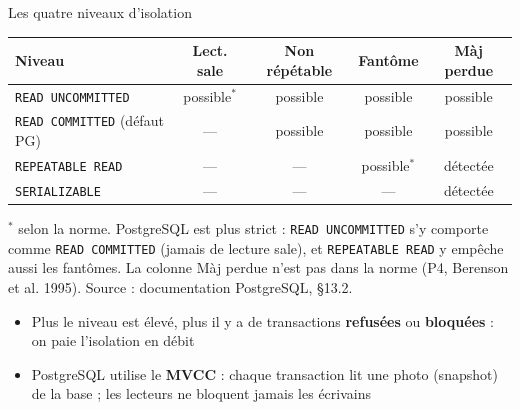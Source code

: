 \documentclass[aspectratio=169,10pt]{beamer}
\begin{document}
\begin{frame}{Les quatre niveaux d'isolation}
  \begin{datacard}
    \small
    \begin{tabular}{@{}lcccc@{}}
      \toprule
      \textbf{Niveau} & \textbf{Lect. sale} & \textbf{Non r\'ep\'etable} & \textbf{Fant\^ome} & \textbf{M\`aj perdue} \\
      \midrule
      \texttt{READ UNCOMMITTED} & possible$^{*}$ & possible & possible & possible \\
      \texttt{READ COMMITTED} (d\'efaut PG) & --- & possible & possible & \alert{possible} \\
      \texttt{REPEATABLE READ} & --- & --- & possible$^{*}$ & d\'etect\'ee \\
      \texttt{SERIALIZABLE} & --- & --- & --- & d\'etect\'ee \\
      \bottomrule
    \end{tabular}
  \end{datacard}
  \vspace{1mm}
  {\footnotesize\color{qamuted} $^{*}$ selon la norme. PostgreSQL est plus strict : \texttt{READ UNCOMMITTED} s'y comporte comme \texttt{READ COMMITTED}
  (jamais de lecture sale), et \texttt{REPEATABLE READ} y emp\^eche aussi les fant\^omes.
  La colonne \og M\`aj perdue \fg{} n'est pas dans la norme (P4, Berenson et al. 1995).
  Source : documentation PostgreSQL, \S13.2.}
  \begin{itemize}
    \item Plus le niveau est \'elev\'e, plus il y a de transactions \textbf{refus\'ees} ou \textbf{bloqu\'ees} : on paie l'isolation en d\'ebit
    \item PostgreSQL utilise le \textbf{MVCC} : chaque transaction lit une \og photo \fg{} (snapshot) de la base ; les lecteurs ne bloquent jamais les \'ecrivains
  \end{itemize}
\end{frame}
\end{document}
